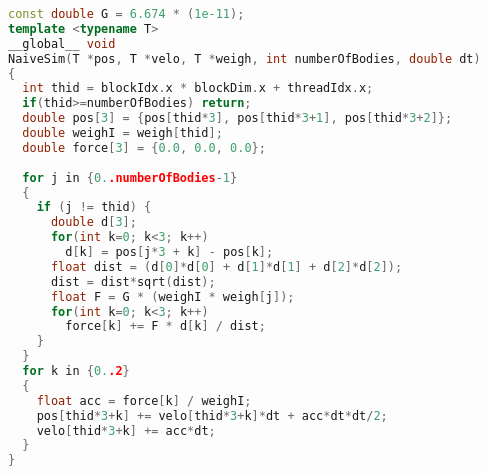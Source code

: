\documentclass[14pt,twoside,a4paper]{article}
\theoremstyle{definition}
\begin{document}
\begin{lstlisting}[language=C++, frame=single, framerule=2pt, caption=Kernel NaiveSim]
const double G = 6.674 * (1e-11);
template <typename T>
__global__ void 
NaiveSim(T *pos, T *velo, T *weigh, int numberOfBodies, double dt) 
{
  int thid = blockIdx.x * blockDim.x + threadIdx.x;
  if(thid>=numberOfBodies) return;
  double pos[3] = {pos[thid*3], pos[thid*3+1], pos[thid*3+2]};
  double weighI = weigh[thid];
  double force[3] = {0.0, 0.0, 0.0};
  
  for j in {0..numberOfBodies-1}
  {
    if (j != thid) {
      double d[3];
      for(int k=0; k<3; k++) 
        d[k] = pos[j*3 + k] - pos[k];
      float dist = (d[0]*d[0] + d[1]*d[1] + d[2]*d[2]);
      dist = dist*sqrt(dist);
      float F = G * (weighI * weigh[j]);
      for(int k=0; k<3; k++)
        force[k] += F * d[k] / dist;	
    }
  }
  for k in {0..2}
  {
    float acc = force[k] / weighI;
    pos[thid*3+k] += velo[thid*3+k]*dt + acc*dt*dt/2;
    velo[thid*3+k] += acc*dt;
  }
}
\end{lstlisting}
\bigskip
\end{document}
